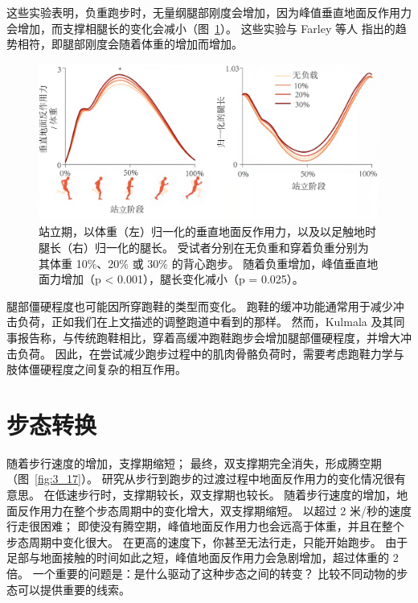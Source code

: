 这些实验表明，负重跑步时，无量纲腿部刚度会增加，因为峰值垂直地面反作用力会增加，而支撑相腿长的变化会减小（图~\ref{fig:3_16}）。
这些实验与 Farley 等人\cite{farley1993running} 指出的趋势相符，即腿部刚度会随着体重的增加而增加。

\begin{figure}[!htb]
	\centering
	\includegraphics[width=0.4\linewidth]{chap3/3_16}
	\caption{站立期，以体重（左）归一化的垂直地面反作用力，以及以足触地时腿长（右）归一化的腿长。
		受试者分别在无负重和穿着负重分别为其体重 10\%、20\% 或 30\% 的背心跑步。
		随着负重增加，峰值垂直地面力增加（p < 0.001），腿长变化减小（p = 0.025）\cite{silder2015running}。 \label{fig:3_16}}
\end{figure}

腿部僵硬程度也可能因所穿跑鞋的类型而变化。
跑鞋的缓冲功能通常用于减少冲击负荷，正如我们在上文描述的调整跑道中看到的那样。
然而，Kulmala 及其同事\cite{kulmala2018running}报告称，与传统跑鞋相比，穿着高缓冲跑鞋跑步会增加腿部僵硬程度，并增大冲击负荷。
因此，在尝试减少跑步过程中的肌肉骨骼负荷时，需要考虑跑鞋力学与肢体僵硬程度之间复杂的相互作用。


\section{步态转换}

随着步行速度的增加，支撑期缩短；
最终，双支撑期完全消失，形成腾空期（图~\ref{fig:3_17}）。
研究从步行到跑步的过渡过程中地面反作用力的变化情况很有意思。
在低速步行时，支撑期较长，双支撑期也较长。
随着步行速度的增加，地面反作用力在整个步态周期中的变化增大，双支撑期缩短。
以超过 2 米/秒的速度行走很困难；
即使没有腾空期，峰值地面反作用力也会远高于体重，并且在整个步态周期中变化很大。
在更高的速度下，你甚至无法行走，只能开始跑步。
由于足部与地面接触的时间如此之短，峰值地面反作用力会急剧增加，超过体重的 2 倍。
一个重要的问题是：是什么驱动了这种步态之间的转变？
比较不同动物的步态可以提供重要的线索。


